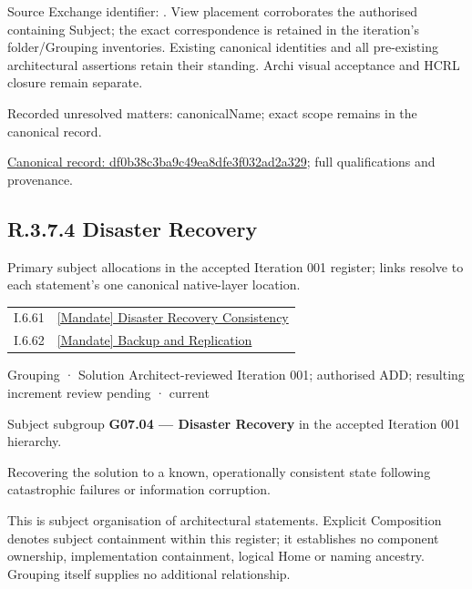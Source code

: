 Source Exchange identifier: \texttt{}. View placement corroborates
the authorised containing Subject; the exact correspondence is retained in the
iteration's folder/Grouping inventories. Existing canonical identities and all
pre-existing architectural assertions retain their standing. Archi visual
acceptance and HCRL closure remain separate.


{\small Recorded unresolved matters: canonicalName; exact scope remains in the canonical record.}\par
{\footnotesize \href{../../../../continuum/grouping/df0b38c3ba9c49ea8dfe3f032ad2a329.md}{Canonical record: df0b38c3ba9c49ea8dfe3f032ad2a329}; full qualifications and provenance.}\par
\subsection*{R.3.7.4 Disaster Recovery}
\label{navigation:R.3.7.4}

Primary subject allocations in the accepted Iteration 001 register; links resolve to each statement’s one canonical native-layer location.\par
\begin{longtable}{p{.22\linewidth}p{.73\linewidth}}
I.6.61 & \hyperref[element:81fdb5611a0f4338ae85478781032dd7]{[Mandate] Disaster Recovery Consistency} \\
I.6.62 & \hyperref[element:8731f88e202a4f5dacb408e5a1d474a8]{[Mandate] Backup and Replication} \\
\end{longtable}
\label{element:49966f8f01e244b4926ce4dc4c41fb47}
{\small Grouping · Solution Architect-reviewed Iteration 001; authorised ADD; resulting increment review pending · current}\par

Subject subgroup \textbf{G07.04 — Disaster Recovery} in the accepted Iteration 001 hierarchy.



Recovering the solution to a known, operationally consistent state following catastrophic failures or information corruption.



This is subject organisation of architectural statements. Explicit Composition denotes subject containment within this register; it establishes no component ownership, implementation containment, logical Home or naming ancestry. Grouping itself supplies no additional relationship.


